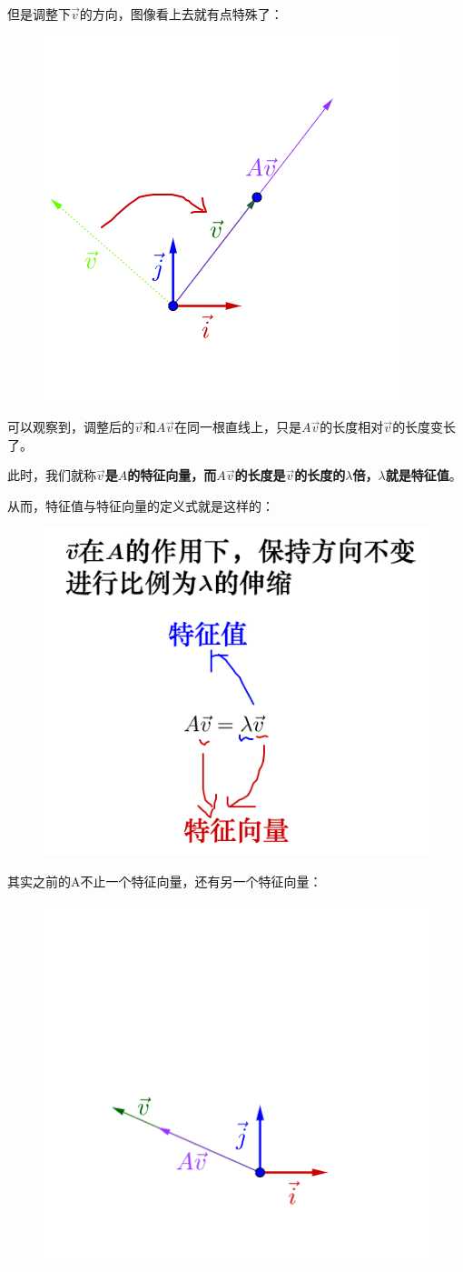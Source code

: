 \documentclass[12pt]{article}
\begin{document}
但是调整下$\vec{v_{}}$的方向，图像看上去就有点特殊了：
\begin{figure}[H]
    \centering
    \includegraphics[width=.3\textwidth]{fig/UnderstandEigenValueVector_3.png}
\end{figure} 

可以观察到，调整后的$\vec{v_{}}$和$A\vec{v_{}}$在同一根直线上，只是$A\vec{v_{}}$的长度相对$\vec{v_{}}$的长度变长了。

此时，我们就称\textbf{$\vec{v_{}}$是$A$的特征向量，而$A\vec{v_{}}$的长度是$\vec{v_{}}$的长度的$\lambda$倍，$\lambda$就是特征值}。

从而，特征值与特征向量的定义式就是这样的：

\begin{figure}[H]
    \centering
    \includegraphics[width=.5\textwidth]{fig/UnderstandEigenValueVector_4.png}
\end{figure} 

其实之前的A不止一个特征向量，还有另一个特征向量：
\begin{figure}[H]
    \centering
    \includegraphics[width=.3\textwidth]{fig/UnderstandEigenValueVector_5.png}
\end{figure} 
\end{document}

